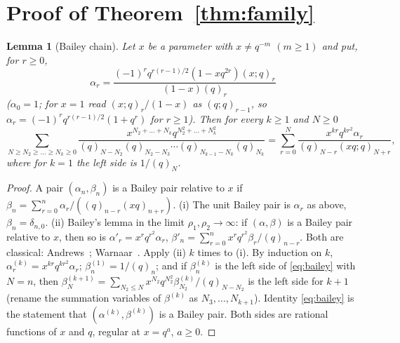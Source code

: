 \documentclass[11pt]{amsart}
\newtheorem{lemma}[theorem]{Lemma}
\theoremstyle{definition}
\numberwithin{equation}{section}
\begin{document}
\section{Proof of Theorem~\ref{thm:family}}\label{sec:family}

\begin{lemma}[Bailey chain]\label{lem:bailey}
Let $x$ be a parameter with $x\ne q^{-m}$ $(m\ge1)$ and put, for $r\ge0$,
\[
\alpha_r=\frac{(-1)^rq^{r(r-1)/2}(1-xq^{2r})(x;q)_r}{(1-x)(q)_r}
\]
($\alpha_0=1$; for $x=1$ read $(x;q)_r/(1-x)$ as $(q;q)_{r-1}$, so $\alpha_r=(-1)^rq^{r(r-1)/2}(1+q^r)$ for $r\ge1$).
Then for every $k\ge1$ and $N\ge0$
\begin{equation}\label{eq:bailey}
\sum_{N\ge N_2\ge\dots\ge N_k\ge0}\frac{x^{N_2+\dots+N_k}q^{N_2^2+\dots+N_k^2}}{(q)_{N-N_2}(q)_{N_2-N_3}\cdots(q)_{N_{k-1}-N_k}(q)_{N_k}}
=\sum_{r=0}^{N}\frac{x^{kr}q^{kr^2}\alpha_r}{(q)_{N-r}(xq;q)_{N+r}},
\end{equation}
where for $k=1$ the left side is $1/(q)_N$.
\end{lemma}
\begin{proof}
A pair $(\alpha_n,\beta_n)$ is a Bailey pair relative to $x$ if
$\beta_n=\sum_{r=0}^n\alpha_r/((q)_{n-r}(xq)_{n+r})$. (i) The unit Bailey pair is $\alpha_r$ as above,
$\beta_n=\delta_{n,0}$. (ii) Bailey's lemma in the limit $\rho_1,\rho_2\to\infty$: if $(\alpha,\beta)$ is a
Bailey pair relative to $x$, then so is $\alpha'_r=x^rq^{r^2}\alpha_r$,
$\beta'_n=\sum_{r=0}^nx^rq^{r^2}\beta_r/(q)_{n-r}$. Both are classical: Andrews~\cite[(2.3)--(2.6), Theorem~1
(2.7), and (2.12)--(2.13) for the unit pair]{Andrews84}; Warnaar~\cite[(1.3), Theorem~2.1, (2.2), (2.3)]{Warnaar50}.
Apply (ii) $k$ times to (i). By induction on $k$, $\alpha^{(k)}_r=x^{kr}q^{kr^2}\alpha_r$;
$\beta^{(1)}_n=1/(q)_n$; and if $\beta^{(k)}_n$ is the left side of \eqref{eq:bailey} with $N=n$, then
$\beta^{(k+1)}_N=\sum_{N_2\le N}x^{N_2}q^{N_2^2}\beta^{(k)}_{N_2}/(q)_{N-N_2}$ is the left side for $k+1$ (rename the
summation variables of $\beta^{(k)}$ as $N_3,\dots,N_{k+1}$). Identity \eqref{eq:bailey} is the statement that
$(\alpha^{(k)},\beta^{(k)})$ is a Bailey pair. Both sides are rational functions of $x$ and $q$, regular at
$x=q^a$, $a\ge0$.
\end{proof}
\end{document}
